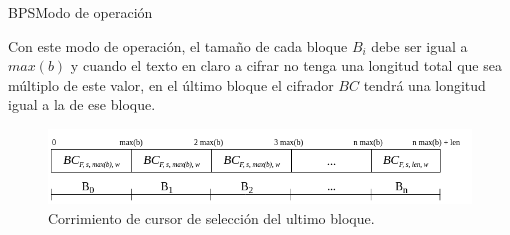 \begin{frame}{BPS}{Modo de operación}

  Con este modo de operación, el tamaño de cada bloque $B_i$ debe ser igual 
  a $max(b)$ y cuando el texto en claro a cifrar no tenga una longitud total 
  que sea múltiplo de este valor, en el último bloque el cifrador $BC$ tendrá 
  una longitud igual a la de ese bloque.

  \begin{figure}[H]
    \begin{center}
      \includegraphics[width=0.9\linewidth]
        {../../../diagramas_comunes/bps/cursor_bps}
      \caption{Corrimiento de cursor de selección del ultimo bloque.}
     \end{center}
  \end{figure}

\end{frame}

